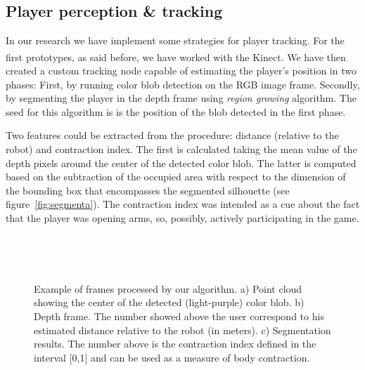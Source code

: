 \subsection{Player perception \& tracking}\label{sec:player_tracking}
In our research we have implement some strategies for player tracking. For the first prototypes, as said before, we have worked with the Kinect\textsuperscript{\textregistered}. %
We have then created a custom tracking node capable of estimating the player's position in two phases: First, by running color blob detection on the RGB image frame. Secondly, by segmenting the player in the depth frame using \textit{region growing} algorithm. The seed for this algorithm is is the position of the blob detected in the first phase.

Two features could be extracted from the procedure: distance (relative to the robot) and contraction index. The first is calculated taking the mean value of the depth pixels around the center of the detected color blob. The latter is computed based on the subtraction of the occupied area with respect to the dimension of the bounding box that encompasses the segmented silhouette (see figure~\ref{fig:segmenta}). The contraction index was intended as a cue about the fact that the player was opening arms, so, possibly, actively participating in the game.

\begin{figure}[h]
  \centering 
  \begin{subfigure}[b]{0.3\textwidth}
		\centering
		\caption{}
  \end{subfigure}
  ~
  \begin{subfigure}[b]{0.3\textwidth}
		\centering
		\caption{}
  \end{subfigure}
  ~
  \begin{subfigure}[b]{0.3\textwidth}
		\centering
		\caption{}
  \end{subfigure}
  \caption{Example of frames processed by our algorithm. a) Point cloud showing the center of the detected (light-purple) color blob. b) Depth frame. The number showed above the user correspond to his estimated distance relative to the robot (in meters). c) Segmentation results. The number above is the contraction index defined in the interval [0,1] and can be used as a measure of body contraction.}\label{fig:segmenta}
   \label{segmentacao}
\end{figure}

